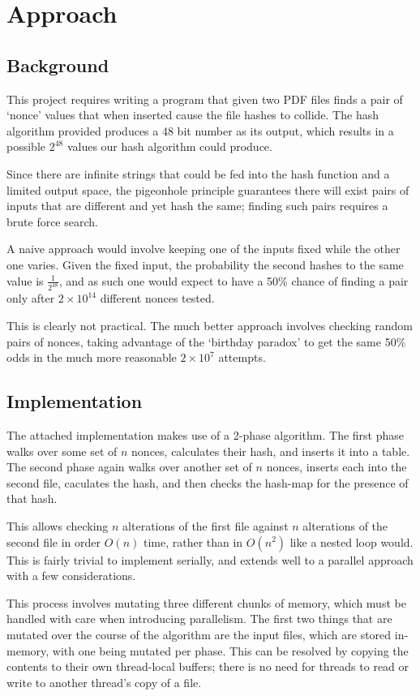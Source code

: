 \documentclass[12pt]{article}
\begin{document}
  \section {Approach}
  \subsection {Background}
  This project requires writing a program that given two PDF files finds a pair 
  of `nonce' values that when inserted cause the file hashes to collide. The hash 
  algorithm provided produces a 48 bit number as its output, which results in a 
  possible $2^{48}$ values our hash algorithm could produce.

  Since there are infinite strings that could be fed into the hash function and
  a limited output space, the pigeonhole principle guarantees there will exist
  pairs of inputs that are different and yet hash the same; finding such pairs 
  requires a brute force search. 

  A naive approach would involve keeping one of the inputs fixed while the other 
  one varies. Given the fixed input, the probability the second hashes to the 
  same value is $\frac{1}{2^{48}}$, and as such one would expect to have a 50\% 
  chance of finding a pair only after $2 \times 10^{14}$ different nonces tested.

  This is clearly not practical. The much better approach involves checking random
  pairs of nonces, taking advantage of the `birthday paradox' to get the same 50\%
  odds in the much more reasonable $2 \times 10^7$ attempts.

  \subsection {Implementation}
  The attached implementation makes use of a 2-phase algorithm. The first phase 
  walks over some set of $n$ nonces, calculates their hash, and inserts it into
  a table. The second phase again walks over another set of $n$ nonces, inserts 
  each into the second file, caculates the hash, and then checks the hash-map 
  for the presence of that hash. 

  This allows checking $n$ alterations of the first file against $n$ alterations 
  of the second file in order $O(n)$ time, rather than in $O(n^2)$ like a nested 
  loop would. This is fairly trivial to implement serially, and extends well to
  a parallel approach with a few considerations.

  This process involves mutating three different chunks of memory, which must be
  handled with care when introducing parallelism. The first two things that are
  mutated over the course of the algorithm are the input files, which are stored
  in-memory, with one being mutated per phase. This can be resolved by copying 
  the contents to their own thread-local buffers; there is no need for threads
  to read or write to another thread's copy of a file.
\end{document}
